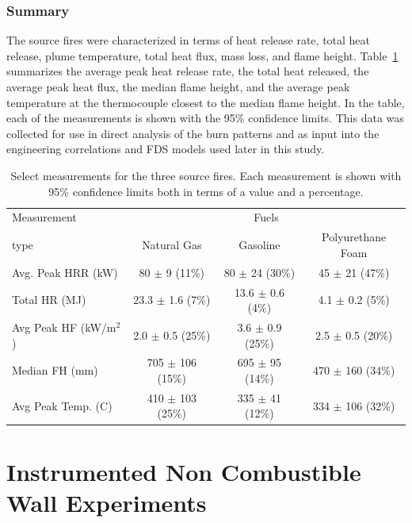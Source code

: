 \documentclass[twoside]{uocthesis}
\begin{document}
{\subsection{Summary}

The source fires were characterized in terms of heat release rate, total heat release, plume temperature, total heat flux, mass loss, and flame height.  Table~\ref{tab:Source_fire_summary} summarizes the average peak heat release rate, the total heat released, the average peak heat flux, the median flame height, and the average peak temperature at the thermocouple closest to the median flame height. In the table, each of the measurements is shown with the 95\% confidence limits.  This data was collected for use in direct analysis of the burn patterns and as input into the engineering correlations and FDS models used later in this study.

\begin{table}
\small
\centering
\begin{tabular}{|l|c|c|c|}
\hline
Measurement     &   \multicolumn{3}{|c|}{Fuels} \\ \cline{2-4}
type                    &       Natural Gas	            &   Gasoline	            & Polyurethane Foam \\ \hline \hline
Avg. Peak HRR (kW)      &       80 $\pm$ 9 (11\%)   &	80 $\pm$ 24 (30\%) 	& 45 $\pm$ 21 (47\%)   \\
Total HR (MJ)           &   	23.3 $\pm$ 1.6 (7\%)   &	13.6 $\pm$ 0.6 (4\%) 	& 4.1 $\pm$ 0.2 (5\%)   \\
Avg Peak HF (kW/m$^2$)   &   	2.0 $\pm$ 0.5 (25\%)   &	3.6 $\pm$ 0.9 (25\%) 	& 2.5 $\pm$ 0.5 (20\%)   \\
Median FH (mm)           &   	705 $\pm$ 106 (15\%)   &	695 $\pm$ 95 (14\%) 	& 470 $\pm$ 160 (34\%)   \\
Avg Peak Temp. (C)      &   	410 $\pm$ 103 (25\%)   &	335 $\pm$ 41 (12\%) 	& 334 $\pm$ 106 (32\%)   \\
\hline
\end{tabular}
 \caption[Select measurements for the three source fires]{Select measurements for the three source fires. Each measurement is shown with 95\% confidence limits both in terms of a value and a percentage.}
 \label{tab:Source_fire_summary}
\end{table}

\chapter{Instrumented Non Combustible Wall Experiments}

}
\end{document}
